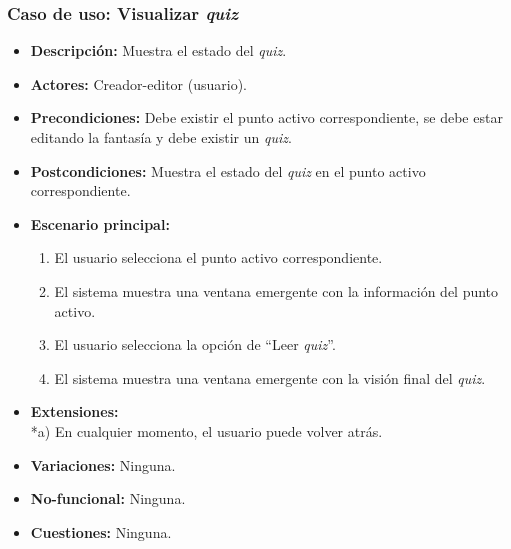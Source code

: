 \subsubsection{Caso de uso: Visualizar \textit{quiz}}
\begin{itemize}
	\item \textbf{Descripción:} Muestra el estado del \textit{quiz}.
	\item \textbf{Actores:} Creador-editor (usuario).
	\item \textbf{Precondiciones:} Debe existir el punto activo correspondiente, se debe estar editando la fantasía y debe existir un \textit{quiz}.
	\item \textbf{Postcondiciones:} Muestra el estado del \textit{quiz} en el punto activo correspondiente.
	\item \textbf{Escenario principal:}
	\begin{enumerate}
		\item El usuario selecciona el punto activo correspondiente.
		\item El sistema muestra una ventana emergente con la información del punto activo.
		\item El usuario selecciona la opción de ``Leer \textit{quiz}''.
		\item El sistema muestra una ventana emergente con la visión final del \textit{quiz}.
	\end{enumerate}
	\item \textbf{Extensiones:} \\ *a) En cualquier momento, el usuario puede volver atrás.
	\item \textbf{Variaciones:} Ninguna.
	\item \textbf{No-funcional:} Ninguna.
	\item \textbf{Cuestiones:} Ninguna.
\end{itemize}

